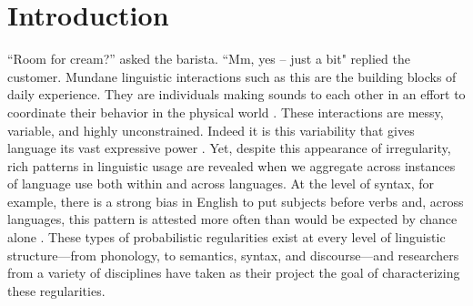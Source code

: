 
\chapter{Introduction}
\label{chapter:introduction}


``Room for cream?'' asked the barista. ``Mm, yes -- just a bit" replied the customer. Mundane linguistic interactions such as this are the building blocks of daily experience. They are individuals making sounds to each other in an effort to coordinate their behavior in the physical world \cite{clark2006social}. These interactions are messy, variable, and highly unconstrained. Indeed it is this variability that gives language its vast expressive power \cite{hockett1960}. Yet, despite this appearance of irregularity, rich patterns in linguistic usage are revealed when we aggregate across instances of language use both within and across languages. At the level of syntax, for example, there is a strong bias in English to put subjects before verbs and, across languages, this pattern is attested more often than would be expected by chance alone  \cite{dryer2005order}. These types of probabilistic regularities exist at every level of linguistic structure---from phonology, to semantics, syntax, and discourse---and researchers from a variety of disciplines have taken as their project the goal of characterizing these regularities.


